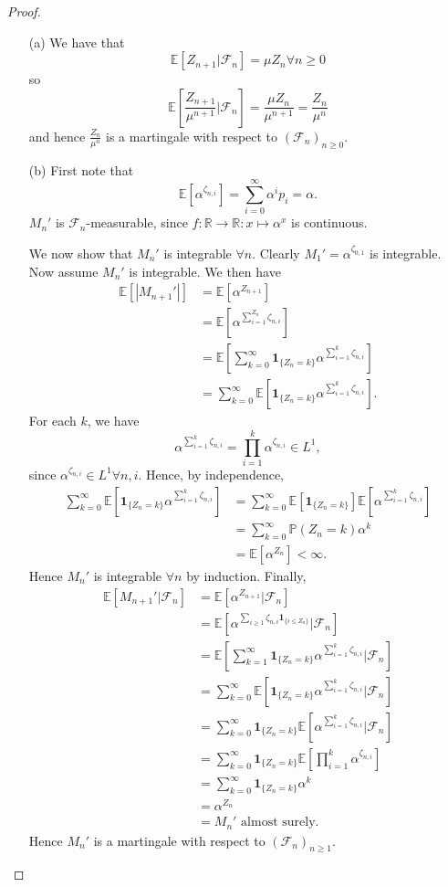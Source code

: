 \documentclass{article}
\begin{document}
\begin{proof}
\begin{enumerate}
    \item[(a)] We have that \[\mathbb{E}[Z_{n+1}|\mathcal{F}_n]=\mu Z_n\forall n\geq 0\] so \[\mathbb{E}\left[\frac{Z_{n+1}}{\mu^{n+1}}|\mathcal{F}_n\right]=\frac{\mu Z_n}{\mu^{n+1}}=\frac{Z_n}{\mu^n}\] and hence $\frac{Z_n}{\mu^n}$ is a martingale with respect to $(\mathcal{F}_n)_{n\geq0}$.
    \item[(b)] First note that \[\mathbb{E}[\alpha^{\zeta_{n,i}}]=\sum_{i=0}^\infty\alpha^ip_i=\alpha.\]$M_n'$ is $\mathcal{F}_n$-measurable, since $f:\mathbb{R}\to\mathbb{R}:x\mapsto\alpha^x$ is continuous.
    
    We now show that $M_n'$ is integrable $\forall n$. Clearly $M_1'=\alpha^{\zeta_{0,1}}$ is integrable. Now assume $M_n'$ is integrable. We then have
    \begin{align*}\mathbb{E}[|M_{n+1}'|]&=\mathbb{E}[\alpha^{Z_{n+1}}]\\&=\mathbb{E}[\alpha^{\sum_{i=1}^{Z_n}\zeta_{n,i}}]\\&=\mathbb{E}[\sum_{k=0}^\infty\mathbf{1}_{\{Z_n=k\}}\alpha^{\sum_{i=1}^k\zeta_{n,i}}]\\&=\sum_{k=0}^\infty\mathbb{E}[\mathbf{1}_{\{Z_n=k\}}\alpha^{\sum_{i=1}^k\zeta_{n,i}}].\end{align*} For each $k$, we have\[\alpha^{\sum_{i=1}^k\zeta_{n,i}}=\prod_{i=1}^k\alpha^{\zeta_{n,i}}\in L^1,\] since $\alpha^{\zeta_{n,i}}\in L^1\forall n,i$. Hence, by independence,\begin{align*}
    \sum_{k=0}^\infty\mathbb{E}[\mathbf{1}_{\{Z_n=k\}}\alpha^{\sum_{i=1}^k\zeta_{n,i}}]&=\sum_{k=0}^\infty\mathbb{E}[\mathbf{1}_{\{Z_n=k\}}]\mathbb{E}[\alpha^{\sum_{i=1}^k\zeta_{n,i}}]\\&=\sum_{k=0}^\infty\mathbb{P}(Z_n=k)\alpha^k\\&=\mathbb{E}[\alpha^{Z_n}]<\infty.
    \end{align*} Hence $M_n'$ is integrable $\forall n$ by induction.
    Finally,
    \begin{align*}\mathbb{E}[M_{n+1}'|\mathcal{F}_n]&=\mathbb{E}[\alpha^{Z_{n+1}}|\mathcal{F}_n]\\&=\mathbb{E}[\alpha^{\sum_{i\geq1}\zeta_{n,i}\mathbf{1}_{\{i\leq Z_n\}}}|\mathcal{F}_n]\\&=\mathbb{E}\left[\sum_{k=1}^\infty\mathbf{1}_{\{Z_n=k\}}\alpha^{\sum_{i=1}^k\zeta_{n,i}}|\mathcal{F}_n\right]\\&=\sum_{k=0}^\infty\mathbb{E}[\mathbf{1}_{\{Z_n=k\}}\alpha^{\sum_{i=1}^k\zeta_{n,i}}|\mathcal{F}_n]\\&=\sum_{k=0}^\infty\mathbf{1}_{\{Z_n=k\}}\mathbb{E}[\alpha^{\sum_{i=1}^k\zeta_{n,i}}|\mathcal{F}_n]\\&=\sum_{k=0}^\infty\mathbf{1}_{\{Z_n=k\}}\mathbb{E}[\prod_{i=1}^k\alpha^{\zeta_{n,i}}]\\&=\sum_{k=0}^\infty\mathbf{1}_{\{Z_n=k\}}\alpha^k\\&=\alpha^{Z_n}\\&=M_n'\text{ almost surely.}\end{align*}Hence $M_n'$ is a martingale with respect to $(\mathcal{F}_n)_{n\geq1}$.

\end{enumerate}
\end{proof}
\end{document}
